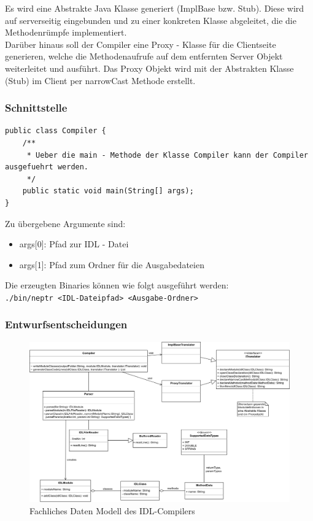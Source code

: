 \documentclass{article}
\begin{document}
Es wird eine Abstrakte Java Klasse generiert (ImplBase bzw. Stub). Diese wird auf serverseitig eingebunden und zu einer
konkreten Klasse abgeleitet, die die Methodenrümpfe implementiert.\\

Darüber hinaus soll der Compiler eine Proxy - Klasse für die Clientseite generieren, welche die Methodenaufrufe auf dem
entfernten Server Objekt weiterleitet und ausführt. Das Proxy Objekt wird mit der Abstrakten Klasse (Stub) im Client
per narrowCast Methode erstellt.

\subsubsection{Schnittstelle}
\begin{lstlisting}
public class Compiler {
    /**
     * Ueber die main - Methode der Klasse Compiler kann der Compiler ausgefuehrt werden.
     */
    public static void main(String[] args);
}
\end{lstlisting}
Zu übergebene Argumente sind:
\begin{itemize}
	\item args[0]: Pfad zur IDL - Datei
	\item args[1]: Pfad zum Ordner für die Ausgabedateien
\end{itemize}

Die erzeugten Binaries können wie folgt ausgeführt werden:\\

\texttt{./bin/neptr <IDL-Dateipfad> <Ausgabe-Ordner>}

\subsubsection{Entwurfsentscheidungen}
\begin{figure}[H]
    \centering
    \includegraphics[width=\textwidth]{Compiler_FDM.png}
    \caption[fdm-compiler]{Fachliches Daten Modell des IDL-Compilers}
    \label{fig:fdm-compiler}
\end{figure}
\end{document}
